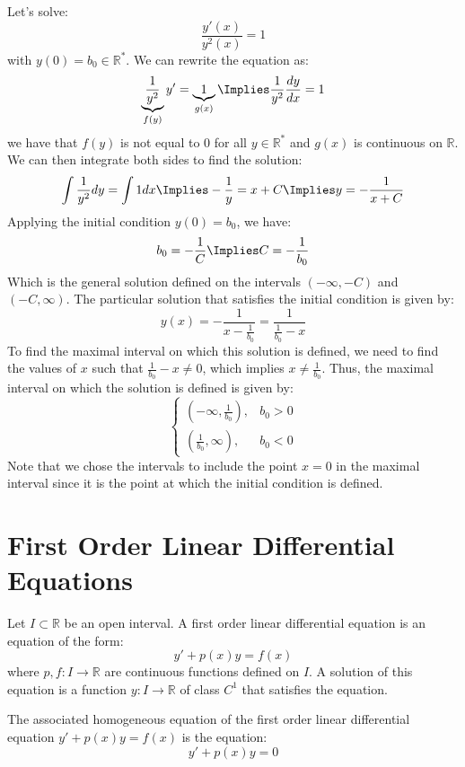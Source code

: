 \begin{eg}
    Let's solve:
    \[
        \frac{y'(x)}{y^2(x)} = 1
    \]
    with $y(0) = b_0 \in \mathbb{R}^*$. We can rewrite the equation as:
    \[
        \underbrace{\frac{1}{y^2}}_{f(y)} y' = \underbrace{1}_{g(x)} \Implies \frac{1}{y^2} \frac{dy}{dx} = 1
    \]
    we have that $f(y)$ is not equal to $0$ for all $y \in \mathbb{R}^*$ and $g(x)$ is continuous on $\mathbb{R}$. We can then integrate both sides to find the solution:
    \[
        \int \frac{1}{y^2} dy = \int 1 dx \Implies -\frac{1}{y} = x + C \Implies y = -\frac{1}{x + C}
    \]
    Applying the initial condition $y(0) = b_0$, we have:
    \[
        b_0 = -\frac{1}{C} \Implies C = -\frac{1}{b_0}
    \]
    Which is the general solution defined on the intervals $\left(- \infty, -C\right)$ and $\left(-C, \infty\right)$. The particular solution that satisfies the initial condition is given by:
    \[
        y(x) = -\frac{1}{x - \frac{1}{b_0}} = \frac{1}{\frac{1}{b_0} - x}
    \]
    To find the maximal interval on which this solution is defined, we need to find the values of $x$ such that $\frac{1}{b_0} - x \neq 0$, which implies $x \neq \frac{1}{b_0}$. Thus, the maximal interval on which the solution is defined is given by:
    \[
        \begin{cases}
            \left(-\infty, \frac{1}{b_0}\right), & b_0 > 0 \\
            \left(\frac{1}{b_0}, \infty\right), & b_0 < 0
        \end{cases}
    \]
    Note that we chose the intervals to include the point $x = 0$ in the maximal interval since it is the point at which the initial condition is defined.
\end{eg}

\section{First Order Linear Differential Equations}
\begin{definition}
    Let $I \subset \mathbb{R}$ be an open interval. A first order linear differential equation is an equation of the form:
    \[
        y' + p(x) y = f(x)
    \]
    where $p, f: I \to \mathbb{R}$ are continuous functions defined on $I$. A solution of this equation is a function $y: I \to \mathbb{R}$ of class $C^1$ that satisfies the equation.
\end{definition}

\begin{definition}
    The associated homogeneous equation of the first order linear differential equation $y' + p(x) y = f(x)$ is the equation:
    \[
        y' + p(x) y = 0
    \]
\end{definition}

